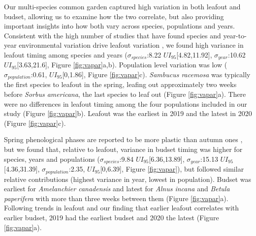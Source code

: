 \documentclass{article}[12pt]
\begin{document}
Our multi-species common garden captured high variation in both leafout and budset, allowing us to examine how the two correlate, but also providing important insights into how both vary across species, populations and years. Consistent with the high number of studies that have found species and year-to-year environmental variation drive leafout variation \citep{delpierre2024, donnelly2017, polgar2011}, we found high variance in leafout timing among species and years ($\sigma_{species}$:8.22 $UI_{95}$[4.82,11.92], $\sigma_{year}$:10.62 $UI_{95}$[3.63,21.6], Figure \ref{fig:vapar}a,b). Population level variation was low ($\sigma_{population}$:0.61, $UI_{95}$[0,1.86], Figure \ref{fig:vapar}c). \emph{Sambucus racemosa} was typically the first species to leafout in the spring, leafing out approximately two weeks before \emph{Sorbus americana}, the last species to leaf out (Figure \ref{fig:vapar}a). There were no differences in leafout timing among the four populations included in our study (Figure \ref{fig:vapar}b). Leafout was the earliest in 2019 and the latest in 2020 (Figure \ref{fig:vapar}c). %

Spring phenological phases are reported to be more plastic than autumn ones \citep{mckown2014, aitken2016, vico2021}, but we found that, relative to leafout, variance in budset timing was higher for species, years and populations ($\sigma_{species}$:9.84 $UI_{95}$[6.36,13.89], $\sigma_{year}$:15.13 $UI_{95}$[4.36,31.39], $\sigma_{population}$:2.35, $UI_{95}$[0,6.39], Figure \ref{fig:vapar}), but followed similar relative contributions (highest variance in year, lowest in population). Budset was earliest for \emph{Amelanchier canadensis} and latest for \emph{Alnus incana} and \emph{Betula paperifera} with more than three weeks between them (Figure \ref{fig:vapar}a). Following trends in leafout and our finding that earlier leafout correlates with earlier budset, 2019 had the earliest budset and 2020 the latest (Figure \ref{fig:vapar}a).
\end{document}

